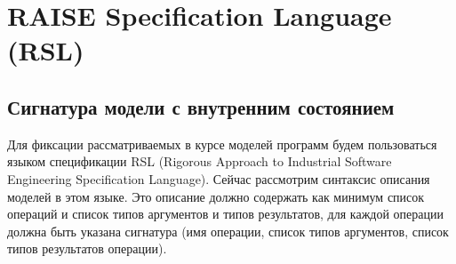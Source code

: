 \documentclass[14pt, twoside]{extreport}
\begin{document}

\chapter{RAISE Specification Language (RSL)}

\section{Сигнатура модели с внутренним состоянием}


Для фиксации рассматриваемых в курсе моделей программ будем пользоваться языком спецификации RSL (Rigorous Approach to Industrial Software Engineering Specification Language). Сейчас рассмотрим синтаксис описания моделей в этом языке. Это описание должно содержать как минимум список операций и список типов аргументов и типов результатов, для каждой операции должна быть указана сигнатура (имя операции, список типов аргументов, список типов результатов операции).
\end{document}
